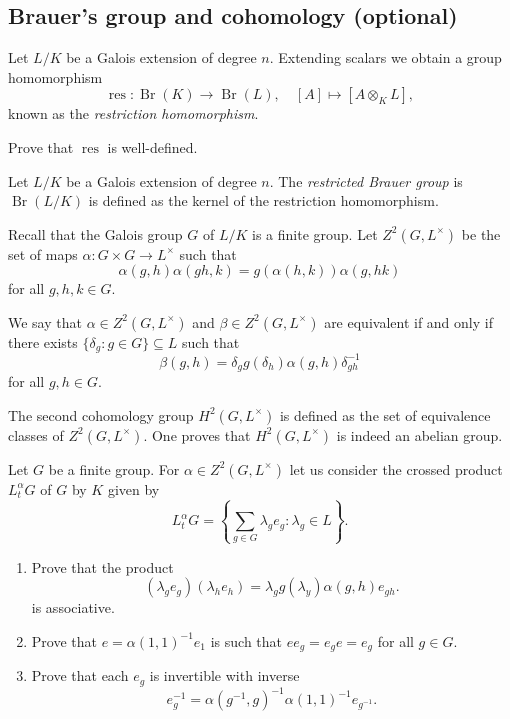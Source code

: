 \subsection{Brauer's group and cohomology (optional)}

Let $L/K$ be a Galois extension of degree $n$.  
Extending scalars we obtain a group homomorphism
\[
    \operatorname{res}\colon\operatorname{Br}(K)\to\operatorname{Br}(L),\quad
    [A]\mapsto [A\otimes_KL],
\]
known as the \emph{restriction homomorphism}. 

\begin{exercise}
    Prove that $\operatorname{res}$ is well-defined.
\end{exercise}

\begin{definition}
    Let $L/K$ be a Galois extension of degree $n$. 
    The \emph{restricted Brauer group} is $\operatorname{Br}(L/K)$ is defined
    as the kernel of the restriction homomorphism. 
\end{definition}


Recall that the Galois group $G$ of $L/K$ is a finite group. Let 
$Z^2(G,L^{\times})$ be the set of maps $\alpha\colon G\times G\to L^{\times}$
such that 
\[
\alpha(g,h)\alpha(gh,k)=g(\alpha(h,k))\alpha(g,hk)
\]
for all $g,h,k\in G$. 

We say that 
$\alpha\in Z^2(G,L^{\times})$ and $\beta\in Z^2(G,L^{\times})$ 
are equivalent if and only if
there exists $\{\delta_g:g\in G\}\subseteq L$ such that 
\[
\beta(g,h)=\delta_gg(\delta_h)\alpha(g,h)\delta^{-1}_{gh}
\]
for all $g,h\in G$. 

The second cohomology group $H^2(G,L^{\times})$ is defined as the
set of equivalence classes of $Z^2(G,L^{\times})$. One proves that
$H^2(G,L^{\times})$ is indeed an abelian group. 

\begin{exercise}
Let $G$ be a finite group. 
For $\alpha\in Z^2(G,L^{\times})$ let us consider the 
crossed product $L_t^{\alpha}G$ of $G$ by $K$ 
given by 
\[
L_t^{\alpha}G=\left\{\sum_{g\in G}\lambda_ge_g:\lambda_g\in L\right\}.
\]
\begin{enumerate}
    \item Prove that the product 
\[
    (\lambda_ge_g)(\lambda_he_h)=\lambda_gg(\lambda_y)\alpha(g,h)e_{gh}.
\]
is associative. 
\item Prove that $e=\alpha(1,1)^{-1}e_1$ is such that 
$ee_g=e_ge=e_g$ for all $g\in G$. 
\item Prove that 
each $e_g$ is invertible with inverse 
\[
e_g^{-1}=\alpha(g^{-1},g)^{-1}\alpha(1,1)^{-1}e_{g^{-1}}.
\]
\end{enumerate}
\end{exercise}

